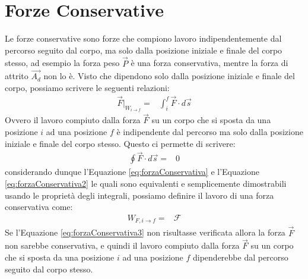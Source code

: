 \section{Forze Conservative}
    Le forze conservative sono forze che compiono lavoro indipendentemente dal percorso seguito dal corpo, ma solo dalla posizione iniziale e finale del corpo stesso, ad esempio la forza peso $\vec{P}$ è una forza conservativa, mentre la forza di attrito $\vec{A_d}$ non lo è. Visto che dipendono solo dalla posizione iniziale e finale del corpo, possiamo scrivere le seguenti relazioni:
    \begin{align}
        \vec{F}|_{W_{i\to f}} =& \int_i^f \vec{F}\cdot d\vec{s} \label{eq:forzaConservativa}
    \end{align}
    Ovvero il lavoro compiuto dalla forza $\vec{F}$ su un corpo che si sposta da una posizione $i$ ad una posizione $f$ è indipendente dal percorso ma solo dalla posizione iniziale e finale del corpo stesso.\newline
    Questo ci permette di scrivere:
    \begin{align}
        \oint \vec{F}\cdot d\vec{s} =& 0 \label{eq:forzaConservativa2}
    \end{align}
    considerando dunque l'Equazione \ref{eq:forzaConservativa} e l'Equazione \ref{eq:forzaConservativa2} le quali sono equivalenti e semplicemente dimostrabili usando le proprietà degli integrali, possiamo definire il lavoro di una forza conservativa come:
    \begin{align}
        W_{F,i\to f} =& \mathcal{F} \label{eq:forzaConservativa3}
    \end{align}
    Se l'Equazione \ref{eq:forzaConservativa3} non risultasse verificata allora la forza $\vec{F}$ non sarebbe conservativa, e quindi il lavoro compiuto dalla forza $\vec{F}$ su un corpo che si sposta da una posizione $i$ ad una posizione $f$ dipenderebbe dal percorso seguito dal corpo stesso.
